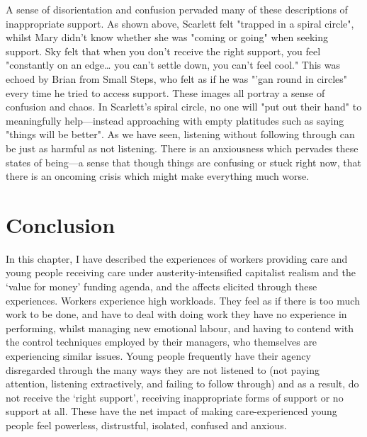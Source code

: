 A sense of disorientation and confusion pervaded many of these descriptions of inappropriate support. As shown above, Scarlett felt "trapped in a spiral circle", whilst Mary didn’t know whether she was "coming or going" when seeking support. Sky felt that when you don’t receive the right support, you feel "constantly on an edge… you can’t settle down, you can’t feel cool." This was echoed by Brian from Small Steps, who felt as if he was "'gan round in circles" every time he tried to access support. These images all portray a sense of confusion and chaos. In Scarlett's spiral circle, no one will "put out their hand" to meaningfully help—instead approaching with empty platitudes such as saying "things will be better". As we have seen, listening without following through can be just as harmful as not listening. There is an anxiousness which pervades these states of being—a sense that though things are confusing or stuck right now, that there is an oncoming crisis which might make everything much worse. 

\section{Conclusion}
In this chapter, I have described the experiences of workers providing care and young people receiving care under austerity-intensified capitalist realism and the `value for money' funding agenda, and the affects elicited through these experiences. Workers experience high workloads. They feel as if there is too much work to be done, and have to deal with doing work they have no experience in performing, whilst managing new emotional labour, and having to contend with the control techniques employed by their managers, who themselves are experiencing  similar issues. Young people frequently have their agency disregarded through the many ways they are not listened to (not paying attention, listening extractively, and failing to follow through) and as a result, do not receive the `right support', receiving inappropriate forms of support or no support at all. These have the net impact of making care-experienced young people feel powerless, distrustful, isolated, confused and anxious. 

